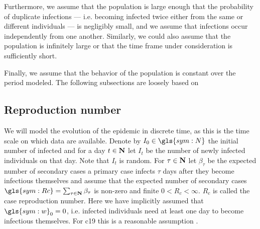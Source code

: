 Furthermore, we assume that the population is large enough that the probability of duplicate infections --- i.e. becoming infected twice either from the same or different individuals --- is negligibly small, and we assume that infections occur independently from one another. Similarly, we could also assume that the population is infinitely large or that the time frame under consideration is sufficiently short.

Finally, we assume that the behavior of the population is constant over the period modeled. 
The following subsections are loosely based on \citep{Diekmann2013Mathematical,Hotz2020Monitoring}


\subsection{Reproduction number}
\label{subsec:reproduction_number}
We will model the evolution of the epidemic in discrete time, as this is the time scale on which data are available. Denote by $I_{0} \in \gls{sym:N}$ the initial number of infected and for a day $t \in \mathbf N$ let $I_{t}$ be the number of newly infected individuals on that day. Note that $I_{t}$ is random. For $\tau\in\mathbf N$ let $\beta_{\tau}$ be the expected number of secondary cases a primary case infects $\tau$ days after they become infectious themselves and assume that the expected number of secondary cases $
\gls{sym:Rc} = \sum_{\tau \in \N}\beta_{\tau}$ is non-zero and finite $0 < R_{c} < \infty$. $R_{c}$ is called the case reproduction number.  Here we have implicitly assumed that $\gls{sym:w}_{0} = 0$, i.e. infected individuals need at least one day to become infectious themselves. For \acrshort{c19} this is a reasonable assumption \citep{Lauer2020Incubation}. 

